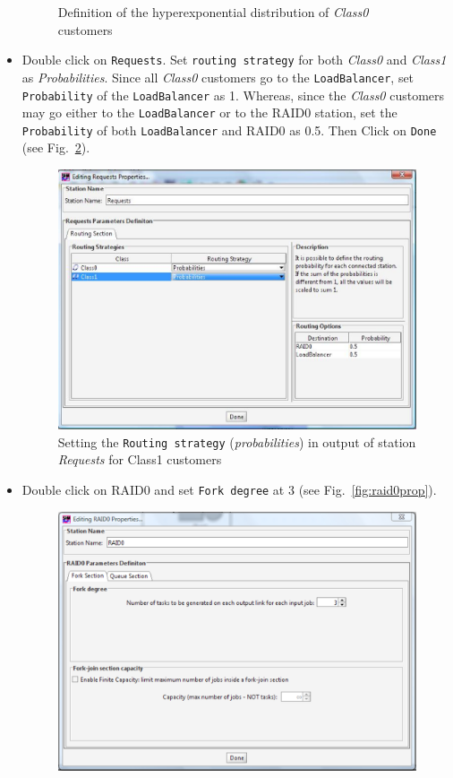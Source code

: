 \begin{itemize}
\begin{figure}[htb]
    \caption{Definition of the hyperexponential distribution
    of \emph{Class0} customers}
    \label{fig:hypeexponcl0}
\end{figure}
\item Double click on \texttt{Requests}. Set \texttt{routing
strategy} for both \emph{Class0} and \emph{Class1} as
\emph{Probabilities}. Since all \emph{Class0} customers go to the
\texttt{LoadBalancer}, set \texttt{Probability} of the
\texttt{LoadBalancer} as 1. Whereas, since the \emph{Class0}
customers may go either to the \texttt{LoadBalancer} or to the
RAID0 station, set the \texttt{Probability} of both
\texttt{LoadBalancer} and RAID0 as 0.5. Then Click on
\texttt{Done} (see Fig.~\ref{fig:parroutstrat}).
\begin{figure}[htb]
    \begin{center}
        \includegraphics[scale=.5]{img/jsimg/12.19.eps}
    \end{center}
    \caption{Setting the \texttt{Routing strategy} (\emph{probabilities}) in output
    of station \emph{Requests} for Class1 customers}
    \label{fig:parroutstrat}
\end{figure}
\item Double click on RAID0 and set \texttt{Fork degree} at 3 (see
Fig.~\ref{fig:raid0prop}).
\begin{figure}[htb]
    \begin{center}
        \includegraphics[scale=.5]{img/jsimg/12.20.eps}

\end{center}
\end{figure}
\end{itemize}
